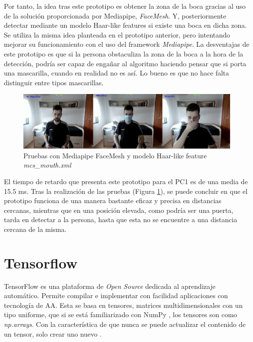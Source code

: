 Por tanto, la idea tras este prototipo es obtener la zona de la boca gracias al uso de la solución proporcionada por Mediapipe, \textit{FaceMesh}. Y, posteriormente detectar mediante un modelo Haar-like features si existe una boca en dicha zona. Se utiliza la misma idea planteada en el prototipo anterior, pero intentando mejorar su funcionamiento con el uso del framework \textit{Mediapipe}. La desventajas de este prototipo es que si la persona obstaculiza la zona de la boca a la hora de la detección, podría ser capaz de engañar al algoritmo haciendo pensar que si porta una mascarilla, cuando en realidad no es así. Lo bueno es que no hace falta distinguir entre tipos mascarillas.

\begin{figure}[htp]
	\centering
	\includegraphics[width=17cm]{imagenes/mediapipe_prueba.png}
	\caption{Pruebas con Mediapipe FaceMesh y modelo Haar-like feature \textit{mcs\_mouth.xml}}
	\label{fig:protoMediapipe}
\end{figure}

El tiempo de retardo que presenta este prototipo para el PC1 es de una media de 15.5 ms. Tras la realización de las pruebas (Figura \ref{fig:protoMediapipe}), se puede concluir en que el prototipo funciona de una manera bastante eficaz y precisa en distancias cercanas, mientras que en una posición elevada, como podría ser una puerta, tarda en detectar a la persona, hasta que esta no  se encuentre a una distancia cercana de la misma.

\newpage
\section{Tensorflow}

TensorFlow es una plataforma de \textit{Open Source} dedicada al aprendizaje automático. Permite compilar e implementar con facilidad aplicaciones con tecnología de AA. Esta se basa en tensores, matrices multidimensionales con un tipo uniforme, que si se está familiarizado con NumPy , los tensores son como \textit{np.arrays}. Con la característica de que nunca se puede actualizar el contenido de un tensor, solo crear uno nuevo \cite{tensorflow}.

